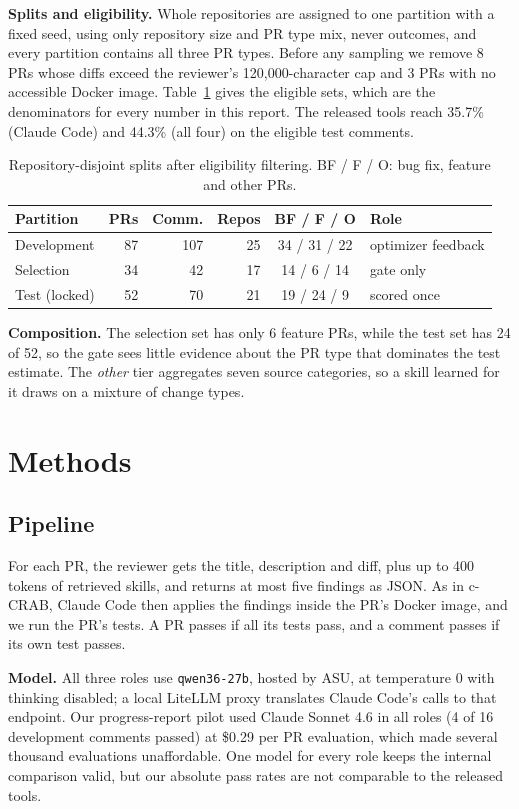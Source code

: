 \documentclass[sigconf, authorversion, nonacm]{acmart}
\begin{document}
\textbf{Splits and eligibility.} Whole repositories are assigned to one partition with a fixed seed, using only repository size and PR type mix, never outcomes, and every partition contains all three PR types. Before any sampling we remove 8 PRs whose diffs exceed the reviewer's 120,000-character cap and 3 PRs with no accessible Docker image. Table~\ref{tab:splits} gives the eligible sets, which are the denominators for every number in this report. The released tools reach 35.7\% (Claude Code) and 44.3\% (all four) on the eligible test comments.

\begin{table}[t]
\caption{Repository-disjoint splits after eligibility filtering. BF / F / O: bug fix, feature and other PRs.}
\label{tab:splits}
\small
\setlength{\tabcolsep}{4pt}
\begin{tabular}{lrrrcl}
\toprule
Partition & PRs & Comm. & Repos & BF / F / O & Role \\
\midrule
Development & 87 & 107 & 25 & 34 / 31 / 22 & optimizer feedback \\
Selection & 34 & 42 & 17 & 14 / 6 / 14 & gate only \\
Test (locked) & 52 & 70 & 21 & 19 / 24 / 9 & scored once \\
\bottomrule
\end{tabular}
\end{table}

\textbf{Composition.} The selection set has only 6 feature PRs, while the test set has 24 of 52, so the gate sees little evidence about the PR type that dominates the test estimate. The \emph{other} tier aggregates seven source categories, so a skill learned for it draws on a mixture of change types.

\section{Methods}
\subsection{Pipeline}
For each PR, the reviewer gets the title, description and diff, plus up to 400 tokens of retrieved skills, and returns at most five findings as JSON. As in c-CRAB, Claude Code then applies the findings inside the PR's Docker image, and we run the PR's tests. A PR passes if all its tests pass, and a comment passes if its own test passes.

\textbf{Model.} All three roles use \texttt{qwen36-27b}, hosted by ASU, at temperature 0 with thinking disabled; a local LiteLLM proxy translates Claude Code's calls to that endpoint. Our progress-report pilot used Claude Sonnet 4.6 in all roles (4 of 16 development comments passed) at \$0.29 per PR evaluation, which made several thousand evaluations unaffordable. One model for every role keeps the internal comparison valid, but our absolute pass rates are not comparable to the released tools.
\end{document}
